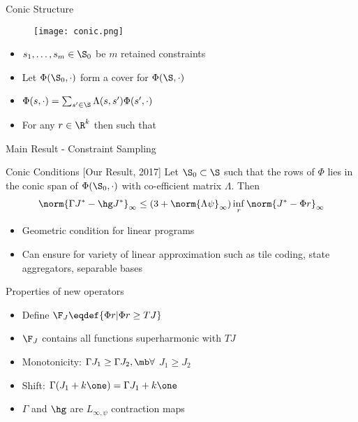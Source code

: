 \documentclass[handout,10pt]{beamer}
\begin{document}
\begin{frame}[fragile]{Conic Structure}
\begin{figure}
\texttt{[image: conic.png]}
\end{figure}
\begin{block}{}
\begin{itemize}
\item $s_1,\ldots,s_m\in \S_0$ be $m$ retained constraints
\item Let $\Phi(\S_0,\cdot)$ form a {\color{orange}{conic}} cover for $\Phi(\S,\cdot)$
\item $\Phi(s,\cdot)=\sum_{s'\in \S}\Lambda(s,s')\Phi(s',\cdot)$
\item For any $r\in \R^k$ {\color{orange}{$\Phi(s,\cdot) r<0$}} then {\color{orange}{$\exists s'\in \S_0$}} such that {\color{orange}{$\Phi(s',\cdot) r<0$}}
\end{itemize}
\end{block}

\end{frame}




\begin{frame}[fragile]{Main Result - Constraint Sampling}
\begin{block}{Conic Conditions [Our Result, 2017]}
Let $\S_0\subset \S$ such that the rows of $\Phi$ lies in the conic span of $\Phi(\S_0,\cdot)$ with co-efficient matrix $\Lambda$. Then
\begin{align*}
\norm{ \Gamma J^*-\hg J^* }_{\infty}\leq (3+\norm{\Lambda \psi}_{\infty})\inf_r\norm{J^*-\Phi r}_{
\infty}
\end{align*}
\end{block}


\begin{itemize}
\item Geometric condition for linear programs
\item Can ensure for variety of linear approximation such as tile coding, state aggregators, separable bases
\end{itemize}
\end{frame}


\begin{frame}[fragile]{Properties of new operators}
\begin{itemize}
\item Define $\F_J\eqdef\{\Phi r | \Phi r\geq TJ \}$
\item $\F_J$ contains all functions superharmonic with $TJ$
\item {Monotonicity:} $\Gamma J_1\geq \Gamma J_2, \mb \forall$ $J_1\geq J_2$
\item {Shift:} $\Gamma (J_1+k\one)= \Gamma J_1+ k\one$
\item $\Gamma$ and $\hg$ are $L_{\infty,\psi}$ contraction maps
\end{itemize}

\end{frame}
\end{document}
